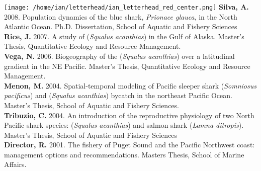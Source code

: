 \documentclass[12pt,mathserif]{beamer}
\newcommand{\PS  }[1]{\color{PS  }{#1 }\color{black}}
\begin{document}
\begin{frame}
\frametitle{}
\begin{center}
\begin{columns}

    \texttt{[image: /home/ian/letterhead/ian\_letterhead\_red\_center.png]}
      \scriptsize{
      \textbf{Silva, A.   } 2008. Population dynamics of the blue shark, \textit{Prionace glauca}, in the North Atlantic Ocean. Ph.D. Dissertation, School of Aquatic and Fishery Sciences                                                                               \\

      \smallskip
      \textbf{Rice, J.    } 2007. A study of \PS{spiny dogfish} (\textit{Squalus acanthias}) in the Gulf of Alaska. Master's Thesis, Quantitative Ecology and Resource Management.                                                                                       \\

      \smallskip
      \textbf{Vega, N.    } 2006. Biogeography of the \PS{spiny dogfish} (\textit{Squalus acanthias}) over a latitudinal gradient in the NE Pacific. Master's Thesis, Quantitative Ecology and Resource Management.                                                      \\

      \smallskip
      \textbf{Menon, M.   } 2004. Spatial-temporal modeling of Pacific sleeper shark (\textit{Somniosus pacificus}) and \PS{spiny dogfish} (\textit{Squalus acanthias}) bycatch in the northeast Pacific Ocean. Master's Thesis, School of Aquatic and Fishery Sciences. \\

      \smallskip
      \textbf{Tribuzio, C.} 2004. An introduction of the reproductive physiology of two North Pacific shark species: \PS{spiny dogfish} (\textit{Squalus acanthias}) and salmon shark (\textit{Lamna ditropis}). Master's Thesis, School of Aquatic and Fishery Sciences \\

      \smallskip
      \textbf{Director, R.} 2001. The \PS{spiny dogfish} fishery of Puget Sound and the Pacific Northwest coast: management options and recommendations. Masters Thesis, School of Marine Affairs.                                                                       \\
      }
\end{columns}
\end{center}
\end{frame}
\end{document}
